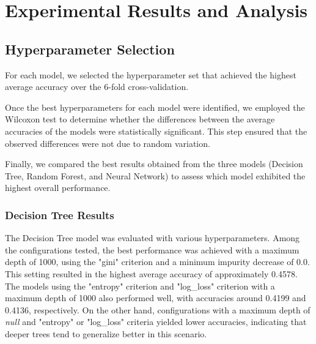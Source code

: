 \section{Experimental Results and Analysis}

\subsection{Hyperparameter Selection}

For each model, we selected the hyperparameter set 
that achieved the highest average accuracy 
over the 6-fold cross-validation. 

Once the best hyperparameters for each model were 
identified, we employed the Wilcoxon test to determine 
whether the differences between the average accuracies 
of the models were statistically significant. 
This step ensured that the observed differences 
were not due to random variation. 

Finally, we compared the best results obtained from 
the three models (Decision Tree, Random Forest, and Neural Network) 
to assess which model exhibited the 
highest overall performance.

\subsubsection{Decision Tree Results}

The Decision Tree model was evaluated with various 
hyperparameters. Among the configurations tested, 
the best performance was achieved with a maximum 
depth of 1000, using the "gini" criterion and a minimum 
impurity decrease of 0.0. 
This setting resulted in the highest average accuracy 
of approximately 0.4578. The models using the "entropy" 
criterion and "log\_loss" criterion with a maximum 
depth of 1000 also performed well, with accuracies 
around 0.4199 and 0.4136, respectively. 
On the other hand, configurations with a maximum depth 
of \textit{null} and "entropy" or "log\_loss" criteria 
yielded lower accuracies, indicating that deeper trees 
tend to generalize better in this scenario.

